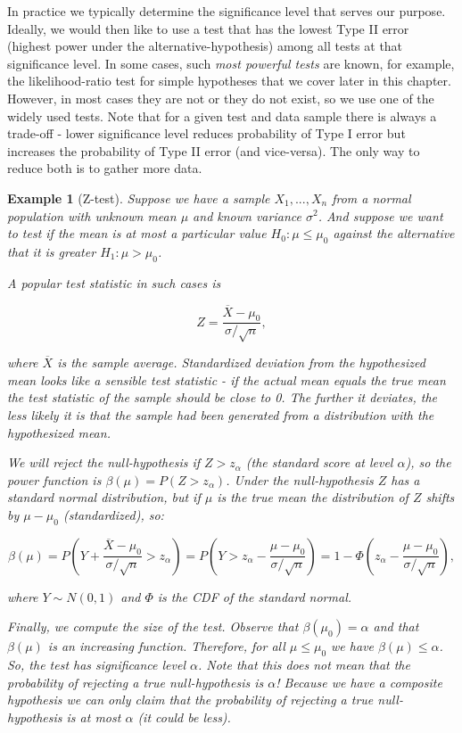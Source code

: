 \documentclass{book}
\theoremstyle{plain}%
\newtheorem{prototheorem}{Example}[section]
\newenvironment{cexample}
   {\colorlet{shadecolor}{gray!10}\begin{shaded}\begin{prototheorem}}
   {\end{prototheorem}\end{shaded}}
\theoremstyle{definition}
\begin{document}
In practice we typically determine the significance level that serves our purpose. Ideally, we would then like to use a test that has the lowest Type II error (highest power under the alternative-hypothesis) among all tests at that significance level. In some cases, such \emph{most powerful tests} are known, for example, the likelihood-ratio test for simple hypotheses that we cover later in this chapter. However, in most cases they are not or they do not exist, so we use one of the widely used tests. Note that for a given test and data sample there is always a trade-off - lower significance level reduces probability of Type I error but increases the probability of Type II error (and vice-versa). The only way to reduce both is to gather more data.

\begin{cexample}[Z-test] Suppose we have a sample $X_1,...,X_n$ from a normal population with unknown mean $\mu$ and known variance $\sigma^2$. And suppose we want to test if the mean is at most a particular value $H_0:\mu \leq \mu_0$ against the alternative that it is greater $H_1: \mu > \mu_0$.

A popular test statistic in such cases is

$$Z = \frac{\overline{X} - \mu_0}{\sigma / \sqrt{n}},$$

where $\overline{X}$ is the sample average. Standardized deviation from the hypothesized mean looks like a sensible test statistic - if the actual mean equals the true mean the test statistic of the sample should be close to 0. The further it deviates, the less likely it is that the sample had been generated from a distribution with the hypothesized mean.

We will reject the null-hypothesis if $Z > z_\alpha$ (the standard score at level $\alpha$), so the power function is $\beta(\mu) = P(Z > z_\alpha)$. Under the null-hypothesis $Z$ has a standard normal distribution, but if $\mu$ is the true mean the distribution of $Z$ shifts by $\mu - \mu_0$ (standardized), so:

$$\beta(\mu) = P(Y + \frac{\overline{X} - \mu_0}{\sigma / \sqrt{n}} > z_\alpha) = P(Y > z_\alpha - \frac{\mu - \mu_0}{\sigma / \sqrt{n}}) = 1 - \Phi(z_\alpha - \frac{\mu - \mu_0}{\sigma / \sqrt{n}}),$$

where $Y \sim N(0,1)$ and $\Phi$ is the CDF of the standard normal.

Finally, we compute the size of the test. Observe that $\beta(\mu_0) = \alpha$ and that $\beta(\mu)$ is an increasing function. Therefore, for all $\mu \leq \mu_0$ we have $\beta(\mu) \leq \alpha$. So, the test has significance level $\alpha$. Note that this does not mean that the probability of rejecting a true null-hypothesis is $\alpha$! Because we have a composite hypothesis we can only claim that the probability of rejecting a true null-hypothesis is at most $\alpha$ (it could be less).
\end{cexample}
\end{document}
